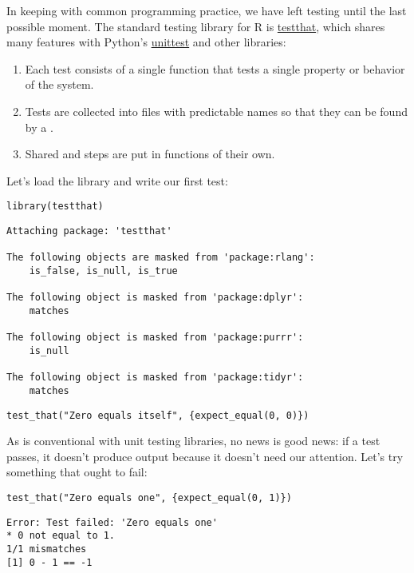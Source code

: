 In keeping with common programming practice,
we have left testing until the last possible moment.
The standard testing library for R is \href{https://github.com/r-lib/testthat}{testthat},
which shares many features with Python's \href{https://docs.python.org/3/library/unittest.html}{unittest}
and other  libraries:

\begin{enumerate}
\item
  Each test consists of a single function
  that tests a single property or behavior of the system.
\item
  Tests are collected into files with predictable names
  so that they can be found by a .
\item
  Shared  and  steps
  are put in functions of their own.
\end{enumerate}

Let's load the library and write our first test:

\begin{lstlisting}
library(testthat)
\end{lstlisting}

\begin{lstlisting}
Attaching package: 'testthat'

The following objects are masked from 'package:rlang':
    is_false, is_null, is_true

The following object is masked from 'package:dplyr':
    matches

The following object is masked from 'package:purrr':
    is_null

The following object is masked from 'package:tidyr':
    matches
\end{lstlisting}

\begin{lstlisting}
test_that("Zero equals itself", {expect_equal(0, 0)})
\end{lstlisting}

As is conventional with unit testing libraries,
no news is good news:
if a test passes,
it doesn't produce output because it doesn't need our attention.
Let's try something that ought to fail:

\begin{lstlisting}
test_that("Zero equals one", {expect_equal(0, 1)})
\end{lstlisting}

\begin{lstlisting}
Error: Test failed: 'Zero equals one'
* 0 not equal to 1.
1/1 mismatches
[1] 0 - 1 == -1
\end{lstlisting}

